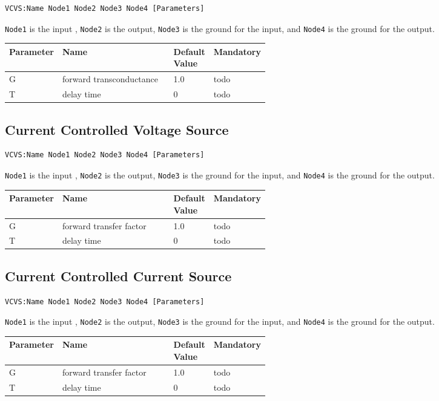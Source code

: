 \begin{verbatim}
VCVS:Name Node1 Node2 Node3 Node4 [Parameters]
\end{verbatim}

\verb+Node1+ is the input , \verb+Node2+ is the output, \verb+Node3+ is the ground for the input, and \verb+Node4+ is the ground for the output.


\begin{tabular}{|l|p{0.5\linewidth}|l|l|}
\hline
Parameter & Name & Default Value & Mandatory \\
\hline
G & forward transconductance & 1.0 & todo \\
T & delay time & 0 & todo \\
\hline
\end{tabular}


\subsection{Current Controlled Voltage Source}

\begin{verbatim}
VCVS:Name Node1 Node2 Node3 Node4 [Parameters]
\end{verbatim}

\verb+Node1+ is the input , \verb+Node2+ is the output, \verb+Node3+ is the ground for the input, and \verb+Node4+ is the ground for the output.


\begin{tabular}{|l|p{0.5\linewidth}|l|l|}
\hline
Parameter & Name & Default Value & Mandatory \\
\hline
G & forward transfer factor & 1.0 & todo \\
T & delay time & 0 & todo \\
\hline
\end{tabular}


\subsection{Current Controlled Current Source}

\begin{verbatim}
VCVS:Name Node1 Node2 Node3 Node4 [Parameters]
\end{verbatim}

\verb+Node1+ is the input , \verb+Node2+ is the output, \verb+Node3+ is the ground for the input, and \verb+Node4+ is the ground for the output.


\begin{tabular}{|l|p{0.5\linewidth}|l|l|}
\hline
Parameter & Name & Default Value & Mandatory \\
\hline
G & forward transfer factor & 1.0 & todo \\
T & delay time & 0 & todo \\
\hline
\end{tabular}


